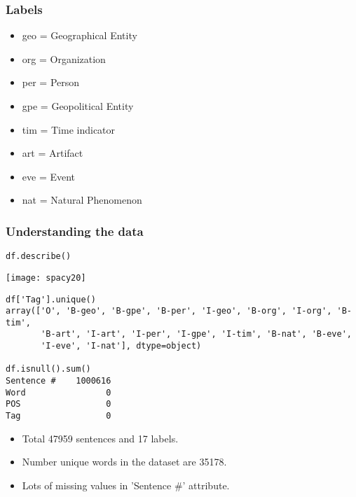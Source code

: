 \begin{frame}[fragile]\frametitle{Labels}
  \begin{itemize}
  \item geo = Geographical Entity
  \item org = Organization
  \item per = Person
  \item gpe = Geopolitical Entity
  \item tim = Time indicator
  \item art = Artifact
  \item eve = Event
  \item nat = Natural Phenomenon
  \end{itemize}
	

\end{frame}

\begin{frame}[fragile]\frametitle{Understanding the data}


\begin{lstlisting}
df.describe()
\end{lstlisting}

\begin{center}
\texttt{[image: spacy20]}
\end{center}

\begin{lstlisting}
df['Tag'].unique()
array(['O', 'B-geo', 'B-gpe', 'B-per', 'I-geo', 'B-org', 'I-org', 'B-tim',
       'B-art', 'I-art', 'I-per', 'I-gpe', 'I-tim', 'B-nat', 'B-eve',
       'I-eve', 'I-nat'], dtype=object)
			 
df.isnull().sum()
Sentence #    1000616
Word                0
POS                 0
Tag                 0
\end{lstlisting}

  \begin{itemize}
  \item Total 47959 sentences and 17 labels.
  \item Number unique words in the dataset are 35178.
	\item Lots of missing values in 'Sentence \#' attribute.
  \end{itemize}
\end{frame}

